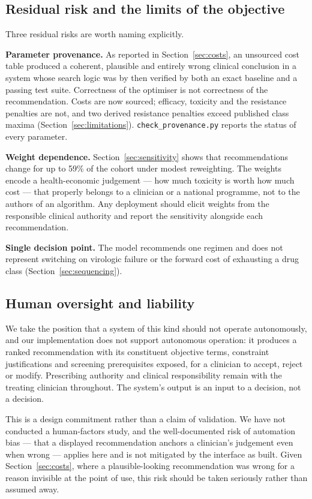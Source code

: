 \documentclass[conference]{IEEEtran}
\begin{document}
\subsection{Residual risk and the limits of the objective}

Three residual risks are worth naming explicitly.

\textbf{Parameter provenance.} As reported in Section~\ref{sec:costs}, an unsourced cost table produced a coherent, plausible and entirely wrong clinical conclusion in a system whose search logic was by then verified by both an exact baseline and a passing test suite. Correctness of the optimiser is not correctness of the recommendation. Costs are now sourced; efficacy, toxicity and the resistance penalties are not, and two derived resistance penalties exceed published class maxima (Section~\ref{sec:limitations}). \texttt{check\_\allowbreak{}provenance.py} reports the status of every parameter.

\textbf{Weight dependence.} Section~\ref{sec:sensitivity} shows that recommendations change for up to 59\% of the cohort under modest reweighting. The weights encode a health-economic judgement --- how much toxicity is worth how much cost --- that properly belongs to a clinician or a national programme, not to the authors of an algorithm. Any deployment should elicit weights from the responsible clinical authority and report the sensitivity alongside each recommendation.

\textbf{Single decision point.} The model recommends one regimen and does not represent switching on virologic failure or the forward cost of exhausting a drug class (Section~\ref{sec:sequencing}).

\subsection{Human oversight and liability}

We take the position that a system of this kind should not operate autonomously, and our implementation does not support autonomous operation: it produces a ranked recommendation with its constituent objective terms, constraint justifications and screening prerequisites exposed, for a clinician to accept, reject or modify. Prescribing authority and clinical responsibility remain with the treating clinician throughout. The system's output is an input to a decision, not a decision.

This is a design commitment rather than a claim of validation. We have not conducted a human-factors study, and the well-documented risk of automation bias --- that a displayed recommendation anchors a clinician's judgement even when wrong --- applies here and is not mitigated by the interface as built. Given Section~\ref{sec:costs}, where a plausible-looking recommendation was wrong for a reason invisible at the point of use, this risk should be taken seriously rather than assumed away.
\end{document}
